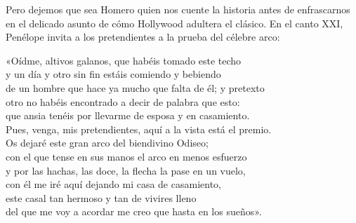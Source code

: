 %

Pero dejemos que sea Homero quien nos cuente la historia antes de enfrascarnos en el delicado asunto de cómo Hollywood adultera el clásico. En el canto XXI, Penélope invita a los pretendientes a la prueba del célebre arco:

\begin{versocita}
«Oídme, altivos galanos, que habéis tomado este techo\\
y un día y otro sin fin estáis comiendo y bebiendo\\
de un hombre que hace ya mucho que falta de él; y pretexto\\
otro no habéis encontrado a decir de palabra que esto:\\
que ansia tenéis por llevarme de esposa y en casamiento.\\
Pues, venga, mis pretendientes, aquí a la vista está el premio.\\
Os dejaré este gran arco del biendivino Odiseo;\\
con el que tense en sus manos el arco en menos esfuerzo\\
y por las hachas, las doce, la flecha la pase en un vuelo,\\
con él me iré aquí dejando mi casa de casamiento,\\
este casal tan hermoso y tan de vivires lleno\\
del que me voy a acordar me creo que hasta en los sueños».
\end{versocita}

